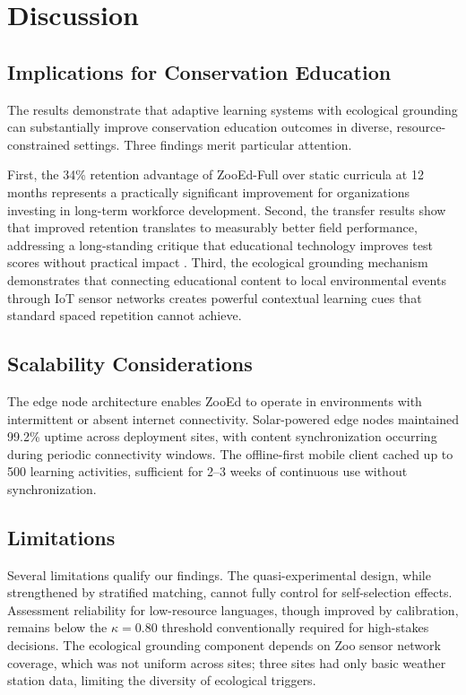 \section{Discussion}

\label{sec:discussion}

\subsection{Implications for Conservation Education}

The results demonstrate that adaptive learning systems with ecological grounding can substantially improve conservation education outcomes in diverse, resource-constrained settings.
Three findings merit particular attention.

First, the 34\% retention advantage of ZooEd-Full over static curricula at 12 months represents a practically significant improvement for organizations investing in long-term workforce development.
Second, the transfer results show that improved retention translates to measurably better field performance, addressing a long-standing critique that educational technology improves test scores without practical impact \citep{stern2014value}.
Third, the ecological grounding mechanism demonstrates that connecting educational content to local environmental events through IoT sensor networks creates powerful contextual learning cues that standard spaced repetition cannot achieve.

\subsection{Scalability Considerations}

The edge node architecture enables ZooEd to operate in environments with intermittent or absent internet connectivity.
Solar-powered edge nodes maintained 99.2\% uptime across deployment sites, with content synchronization occurring during periodic connectivity windows.
The offline-first mobile client cached up to 500 learning activities, sufficient for 2--3 weeks of continuous use without synchronization.

\subsection{Limitations}

Several limitations qualify our findings.
The quasi-experimental design, while strengthened by stratified matching, cannot fully control for self-selection effects.
Assessment reliability for low-resource languages, though improved by calibration, remains below the $\kappa = 0.80$ threshold conventionally required for high-stakes decisions.
The ecological grounding component depends on Zoo sensor network coverage, which was not uniform across sites; three sites had only basic weather station data, limiting the diversity of ecological triggers.

